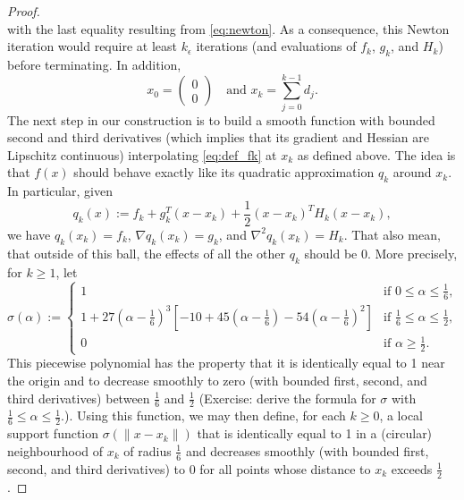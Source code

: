 \documentclass[10pt,a4paper]{article}
\begin{document}
\begin{proof}
\begin{equation*}
	\end{equation*}
	with the last equality resulting from \eqref{eq:newton}. As a consequence, this Newton iteration would require at least $k_\epsilon$ iterations (and evaluations of $f_k$, $g_k$, and $H_k$) before terminating. In addition,
	\begin{equation*}
		x_0 = \begin{pmatrix} 0 \\ 0 \end{pmatrix} \quad \text{and } x_k = \sum_{j=0}^{k-1} d_j. 
	\end{equation*}
	The next step in our construction is to build a smooth function with bounded second and third derivatives (which implies that its gradient and Hessian are Lipschitz continuous) interpolating \eqref{eq:def_fk} at $x_k$ as defined above. The idea is that $f(x)$ should behave exactly like its quadratic approximation $q_k$ around $x_k$. In particular, given 
	\begin{equation*}
		q_k(x) := f_k + g_k^T (x - x_k) + \frac{1}{2} (x - x_k)^T H_k (x - x_k),
	\end{equation*}
	we have $q_k(x_k) = f_k$, $\nabla q_k(x_k) = g_k$, and $\nabla^2 q_k(x_k) = H_k$. That also mean, that outside of this ball, the effects of all the other $q_k$ should be $0$. More precisely, for $k \geq 1$, let
	\begin{equation*}
		\sigma(\alpha) := \begin{cases}
			1 & \text{if } 0 \leq \alpha \leq \frac{1}{6}, \\
			1 + 27\left(\alpha - \frac{1}{6}\right)^3 \left[-10 + 45\left(\alpha - \frac{1}{6}\right) - 54\left(\alpha - \frac{1}{6}\right)^2\right] & \text{if } \frac{1}{6} \leq \alpha \leq \frac{1}{2}, \\
			0 & \text{if } \alpha \geq \frac{1}{2}.
		\end{cases}
	\end{equation*}
	This piecewise polynomial has the property that it is identically equal to 1 near the origin and to decrease smoothly to zero (with bounded first, second, and third derivatives) between $\frac{1}{6}$ and $\frac{1}{2}$ (Exercise: derive the formula for $\sigma$ with $\frac{1}{6}\leq \alpha\leq \frac{1}{2}$.). Using this function, we may then define, for each $k \geq 0$, a local support function $\sigma(\|x - x_k\|)$ that is identically equal to 1 in a (circular) neighbourhood of $x_k$ of radius $\frac{1}{6}$ and decreases smoothly (with bounded first, second, and third derivatives) to 0 for all points whose distance to $x_k$ exceeds $\frac{1}{2}$.

\end{proof}
\end{document}
